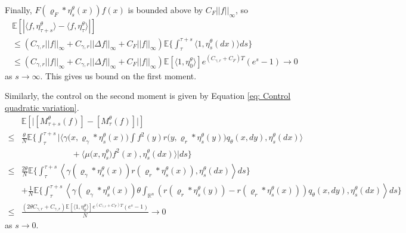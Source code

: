 \documentclass[12pt]{article}
\begin{document}
Finally,  $F(\varrho_{F}*\eta^{\theta}_{s}(x)) f(x)$ is bounded above by $C_F||f||_{\infty}$, so 
\begin{multline}
\mathbb{E}\left[\left| \langle f, \eta^{\theta}_{\tau+s}\rangle - \langle f, \eta^{\theta}_{\tau}\rangle \right|\right] \\
\leq (C_{\gamma,r}||f||_{\infty} + C_{\gamma,r}||\Delta f||_{\infty}+C_F||f||_{\infty}) \mathbb{E}\bigg\{\int_{\tau}^{\tau+s}\bigg\langle 1,\eta^{\theta}_{s}(dx)  \bigg\rangle  ds\bigg\} \\
\leq (C_{\gamma,r}||f||_{\infty} + C_{\gamma,r}||\Delta f||_{\infty}+C_F||f||_{\infty}) \mathbb{E}[\langle 1 ,\eta^{\theta}_{0}\rangle]e^{(C_{\gamma,r}+C_F)T}(e^s-1)\to 0
\end{multline}
as $s \to \infty$. 
This gives us bound on the first moment.


Similarly, the control on the second moment is given by Equation \eqref{eq: Control quadratic variation}.
\begin{equation}
    \label{eq: Controlling Quadratic Jumps}
\begin{aligned}
& \mathbb{E}\left[\big| [M^{\theta}_{\tau+s}(f)] - [M^{\theta}_{\tau}(f)] \big|\right]\\
\leq &\frac{\theta}{N} \mathbb{E} \Bigg\{ \int_{\tau}^{\tau+s}\bigg|
\langle \gamma\big(x,\varrho_{\gamma}*\eta^{\theta}_{s}(x)\big)
\int f^2(y)r\big(y,\varrho_{r}*\eta^{\theta}_{s}(y)\big)q_\theta(x,dy) 
,\eta^{\theta}_{s}(dx)\rangle\\
& \qquad \qquad \qquad +\langle \mu\big(x,\eta^{\theta}_{s}\big)f^2(x) 
,\eta^{\theta}_{s}(dx)\rangle \bigg|ds \Bigg\}\\
\leq & \frac{2\theta}{N}\mathbb{E} \Bigg\{\int_{\tau}^{\tau+s} \left\langle \gamma(\varrho_{\gamma}*\eta^{\theta}_{s}(x))r(\varrho_{r}*\eta^{\theta}_{s}(x)), \eta^{\theta}_{s}(dx) \right\rangle ds\Bigg\} \\
& + \frac{1}{N}\mathbb{E} \Bigg\{\int_{\tau}^{\tau+s} \left\langle \gamma (\varrho_{\gamma}*\eta^{\theta}_{s}(x))\theta\int_{\mathbb{R}^n}\left(r(\varrho_{r}*\eta^{\theta}_{s}(y))-r(\varrho_{r}*\eta^{\theta}_{s}(x))\right) q_\theta(x,dy), \eta^{\theta}_{s}(dx) \right\rangle ds\Bigg\}\\
\leq & \frac{(2 \theta C_{\gamma,r}+C_{\gamma,r})\mathbb{E}[\langle 1 ,\eta^{\theta}_{0}\rangle]e^{(C_{\gamma,r}+C_F)T}(e^s-1)}{N} \to 0
\end{aligned}
\end{equation}
as $s \to 0$.


\end{document}
